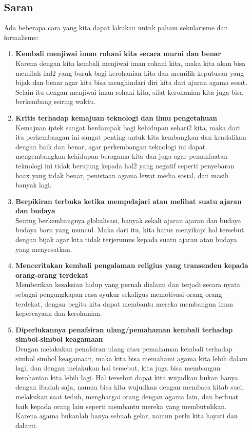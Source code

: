 \documentclass[
  12pt,
]{article}
\begin{document}
    \subsection{Saran}
    Ada beberapa cara yang kita dapat lakukan untuk paham sekularisme dan formalisme:
    \begin{enumerate}
    \item \textbf{Kembali menjiwai iman rohani kita secara murni dan benar} \\
    Karena dengan kita kembali menjiwai iman rohani kita, maka kita akan bisa memilah hal2 yang buruk bagi kerohanian kita dan memilih keputusan yang bijak dan benar agar kita bisa menghindari diri kita dari ajaran agama sesat. Selain itu dengan menjiwai iman rohani kita, sifat kerohanian kita juga bisa berkembang seiring waktu.
      
    \item \textbf{Kritis terhadap kemajuan teknologi dan ilmu pengetahuan} \\
    Kemajuan iptek sangat berdampak bagi kehidupan sehari2 kita, maka dari itu perkembangan ini sangat penting untuk kita kembangkan dan kendalikan dengan baik dan benar, agar perkembangan teknologi ini dapat mengembangkan kehidupan beragama kita dan juga agar pemanfaatan teknologi ini tidak berujung kepada hal2 yang negatif seperti penyebaran hoax yang tidak benar, penistaan agama lewat media sosial, dan masih banyak lagi.
      
    \item \textbf{Berpikiran terbuka ketika mempelajari atau melihat suatu ajaran dan budaya} \\
    Seiring berkembangnya globalisasi, banyak sekali ajaran ajaran dan budaya budaya baru yang muncul. Maka dari itu, kita harus menyikapi hal tersebut dengan bijak agar kita tidak terjerumus kepada suatu ajaran atau budaya yang menyesatkan.
      
    \item \textbf{Menceritakan kembali pengalaman religius yang transenden kepada orang-orang terdekat} \\
    Memberikan kesaksian hidup yang pernah dialami dan terjadi secara nyata sebagai pengungkapan rasa syukur sekaligus memotivasi orang orang terdekat, dengan begitu kita dapat membantu mereka  membangun iman kepercayaan dan kerohanian.
      
    \item \textbf{Diperlukannya penafsiran ulang/pemahaman kembali terhadap simbol-simbol keagamaan} \\
    Dengan melakukan penafsiran ulang atau pemahaman kembali terhadap simbol simbol keagamaan, maka kita bisa memahami agama kita lebih dalam lagi, dan dengan melakukan hal tersebut, kita juga bisa membangun kerohanian kita lebih lagi. Hal tersebut dapat kita wujudkan bukan hanya dengan ibadah saja, namun bisa kita wujudkan dengan membaca kitab suci, melakukan saat teduh, menghargai orang dengan agama lain, dan berbuat baik kepada orang lain seperti membantu mereka yang membutuhkan. Karena agama bukanlah hanya sebuah gelar, namun perlu kita hayati dan dalami.
      

\end{enumerate}
\end{document}
